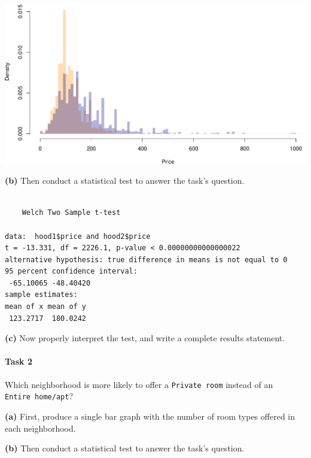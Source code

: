 \documentclass[
]{book}
\newenvironment{Shaded}{\begin{snugshade}}{\end{snugshade}}
\newcommand{\KeywordTok}[1]{\textcolor[rgb]{0.13,0.29,0.53}{\textbf{#1}}}
\newcommand{\NormalTok}[1]{#1}
\newcommand{\OperatorTok}[1]{\textcolor[rgb]{0.81,0.36,0.00}{\textbf{#1}}}
\begin{document}
\includegraphics{figures/unnamed-chunk-211-1.pdf}

\textbf{(b)} Then conduct a statistical test to answer the task's question.

\begin{Shaded}
\end{Shaded}

\begin{verbatim}

    Welch Two Sample t-test

data:  hood1$price and hood2$price
t = -13.331, df = 2226.1, p-value < 0.00000000000000022
alternative hypothesis: true difference in means is not equal to 0
95 percent confidence interval:
 -65.10065 -48.40420
sample estimates:
mean of x mean of y 
 123.2717  180.0242 
\end{verbatim}

\textbf{(c)} Now properly interpret the test, and write a complete results statement.

\hypertarget{task-2-1}{%
\paragraph{Task 2}\label{task-2-1}}

Which neighborhood is more likely to offer a \texttt{Private\ room} instead of an \texttt{Entire\ home/apt}?

\textbf{(a)} First, produce a single bar graph with the number of room types offered in each neighborhood.

\textbf{(b)} Then conduct a statistical test to answer the task's question.
\end{document}
